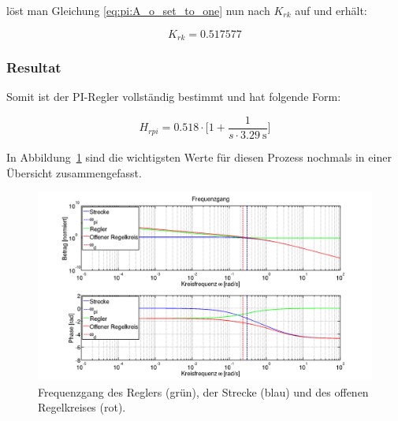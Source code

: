 l\"ost  man Gleichung  \ref{eq:pi:A_o_set_to_one}  nun nach  $K_{rk}$ auf  und
erh\"alt:

\begin{equation} \label{eq:pi:k_rk_result}
    K_{rk} = 0.517577
\end{equation}


\subsubsection{Resultat}

Somit ist der PI-Regler vollst\"andig bestimmt und hat folgende Form:

\begin{equation} \label{eq:pi:result}
    H_{rpi} = 0.518 \cdot \biggl[ 1 + \frac{1}{s \cdot \SI{3.29}{\second}} \biggr]
\end{equation}

In Abbildung~\ref{fig:pi:all} sind die  wichtigsten Werte f\"ur diesen Prozess
nochmals in einer \"Ubersicht zusammengefasst.

\begin{figure}[h! width=\pagewidth]
    \includegraphics[width=\textwidth]{images/piBode.png}
    \caption{%
        Frequenzgang des Reglers (gr\"un), der  Strecke (blau) und des offenen
        Regelkreises (rot).
    }
    \label{fig:pi:all}
\end{figure}
